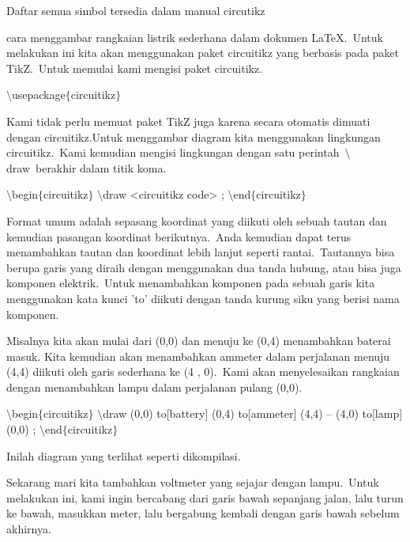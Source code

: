 \noindent 
Daftar semua simbol tersedia dalam manual circutikz
\par


\noindent 
cara menggambar rangkaian listrik sederhana dalam dokumen LaTeX. Untuk melakukan ini kita akan menggunakan paket circuitikz yang berbasis pada paket TikZ. Untuk memulai kami mengisi paket circuitikz.
\par


\noindent 
$\setminus$usepackage$ \{ $circuitikz$ \} $ 
\par


\noindent 
Kami tidak perlu memuat paket TikZ juga karena secara otomatis dimuati dengan circuitikz.Untuk menggambar diagram kita menggunakan lingkungan circuitikz. Kami kemudian mengisi lingkungan dengan satu perintah $\setminus$draw berakhir dalam titik koma.
\par


\noindent 
 $\setminus$begin$ \{ $circuitikz$ \} $ $\setminus$draw <circuitikz code> ; $\setminus$end$ \{ $circuitikz$ \} $ 
\par


\noindent 
Format umum adalah sepasang koordinat yang diikuti oleh sebuah tautan dan kemudian pasangan koordinat berikutnya. Anda kemudian dapat terus menambahkan tautan dan koordinat lebih lanjut seperti rantai. Tautannya bisa berupa garis yang diraih dengan menggunakan dua tanda hubung, atau bisa juga komponen elektrik. Untuk menambahkan komponen pada sebuah garis kita menggunakan kata kunci 'to' diikuti dengan tanda kurung siku yang berisi nama komponen.
\par


\noindent 
Misalnya kita akan mulai dari (0,0) dan menuju ke (0,4) menambahkan baterai masuk. Kita kemudian akan menambahkan ammeter dalam perjalanan menuju (4,4) diikuti oleh garis sederhana ke (4 , 0). Kami akan menyelesaikan rangkaian dengan menambahkan lampu dalam perjalanan pulang (0,0).
\par


\noindent 
 $\setminus$begin$ \{ $circuitikz$ \} $ $\setminus$draw (0,0) to[battery] (0,4) to[ammeter] (4,4) -- (4,0) to[lamp] (0,0) ; $\setminus$end$ \{ $circuitikz$ \} $ 
\par


\noindent 
Inilah diagram yang terlihat seperti dikompilasi.
\par


\noindent 
Sekarang mari kita tambahkan voltmeter yang sejajar dengan lampu. Untuk melakukan ini, kami ingin bercabang dari garis bawah sepanjang jalan, lalu turun ke bawah, masukkan meter, lalu bergabung kembali dengan garis bawah sebelum akhirnya.
\par



